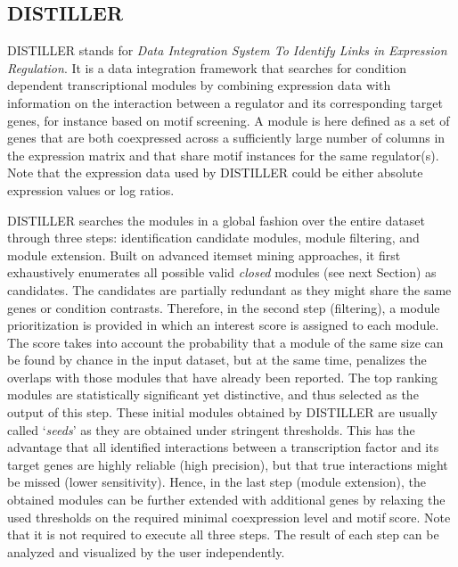 \subsection{DISTILLER}\label{sec:dist-distiller}
DISTILLER stands for \textit{Data Integration System To Identify Links in 
Expression Regulation}. It is a data integration framework that searches for 
condition dependent transcriptional modules by combining expression data with 
information on the interaction between a regulator and its corresponding target 
genes, for instance based on motif screening. A module is here defined as a set 
of genes that are both coexpressed across a sufficiently large number of 
columns in the expression matrix and that share motif instances for the same 
regulator(s). Note that the expression data used by DISTILLER could be either 
absolute expression values or log ratios. 

DISTILLER searches the modules in a global fashion over the entire dataset 
through three steps: identification candidate modules, module filtering, and 
module extension. 
Built on advanced itemset mining approaches, it first 
exhaustively enumerates all possible valid \textit{closed} modules (see next 
Section) as candidates. The candidates are partially redundant as 
they might share the same genes or condition contrasts. 
Therefore, in the second step (filtering), a module prioritization is provided 
in which an interest score is assigned to each module. The score takes into 
account the probability that a module of the same size can be found by chance 
in the input dataset, but at the same time, penalizes the overlaps with those 
modules that have already been reported. The top ranking modules are 
statistically significant yet distinctive, and thus selected as the output of 
this step. 
These initial modules obtained by DISTILLER are usually called `\textit{seeds}' 
as they are obtained under stringent thresholds. 
This has the advantage that all identified interactions between a transcription 
factor and its target genes are highly reliable (high precision), but that true 
interactions might be missed (lower sensitivity).  
Hence, in the last step (module extension), the obtained 
modules can be further extended with additional genes by relaxing the used 
thresholds on the required minimal coexpression level and motif score.  Note 
that it is not required to execute all three steps. 
The result of each step can be analyzed and visualized by the user 
independently.

